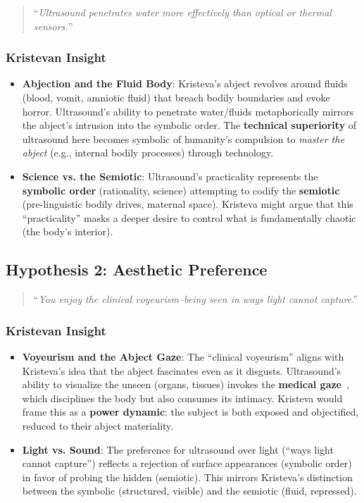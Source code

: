 \documentclass{llncs}
\begin{document}
\begin{quote}
``\emph{Ultrasound penetrates water more effectively than optical or thermal
 sensors.}''
\end{quote}

\subsubsection*{Kristevan Insight}

\begin{itemize}
\item
\textbf{Abjection and the Fluid Body}: Kristeva’s abject revolves around
fluids (blood, vomit, amniotic fluid) that breach bodily boundaries and evoke
horror. Ultrasound’s ability to penetrate water/fluids metaphorically mirrors
the abject’s intrusion into the symbolic order. The \textbf{technical
superiority} of ultrasound here becomes symbolic of humanity’s compulsion to
\emph{master the abject} (e.g., internal bodily processes) through technology.
\item
\textbf{Science vs. the Semiotic}: Ultrasound’s practicality represents the
\textbf{symbolic order} (rationality, science) attempting to codify the
\textbf{semiotic} (pre-linguistic bodily drives, maternal space). Kristeva
might argue that this ``practicality'' masks a deeper desire to control what is fundamentally chaotic (the body’s interior).
\end{itemize}

\subsection*{Hypothesis 2: Aesthetic Preference}

\begin{quote}
``\emph{You enjoy the clinical voyeurism--being seen in ways light cannot
capture}.''
\end{quote}

\subsubsection*{Kristevan Insight}

\begin{itemize}
\item
\textbf{Voyeurism and the Abject Gaze}: The ``clinical voyeurism'' aligns with
Kristeva’s idea that the abject fascinates even as it disgusts. Ultrasound’s
ability to visualize the unseen (organs, tissues) invokes the \textbf{medical
gaze}~\cite{Foucault1973}, which disciplines the body but also consumes its intimacy.
Kristeva would frame this as a \textbf{power dynamic}: the subject is both exposed and
objectified, reduced to their abject materiality.
\item
\textbf{Light vs. Sound}: The preference for ultrasound over light
(``ways light cannot capture'') reflects a rejection of surface appearances
(symbolic order) in favor of probing the hidden (semiotic). This mirrors
Kristeva’s distinction between the symbolic (structured, visible) and the
semiotic (fluid, repressed).
\end{itemize}
\end{document}

